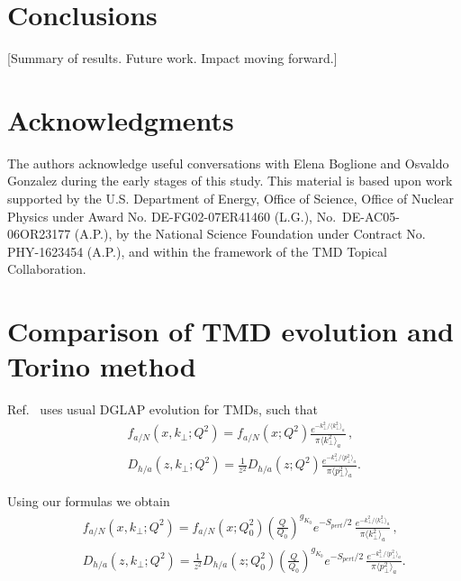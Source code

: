 \documentclass[final,3p,times,onecolumn,sort&compress,hidelinks]{elsarticle}
\begin{document}
\section{Conclusions}
\label{s:concl}

[Summary of results.  Future work.  Impact moving forward.]



\section*{Acknowledgments}

The authors acknowledge useful conversations with Elena Boglione and 
Osvaldo Gonzalez during the early stages of this study.
This material is based upon work supported by the U.S. Department of 
Energy, Office of Science, Office of Nuclear Physics under Award No. 
DE-FG02-07ER41460 (L.G.), No.~DE-AC05-06OR23177 (A.P.), by the National 
Science Foundation under Contract No. PHY-1623454 (A.P.), and within the 
framework of the TMD Topical Collaboration.


\appendix
\section{Comparison of TMD evolution and Torino method}
\label{appendix}

Ref.~\cite{Anselmino:2013lza} uses usual DGLAP evolution for TMDs, such that
\begin{eqnarray}
&&f_{a/N} (x,k_\perp; Q^2)= f_{a/N} (x; Q^2) \frac{e^{-k_\perp^2/{\langle k_\perp^2 \rangle_a}}}{\pi \langle k_\perp^2 \rangle_a}\,,
\nonumber \\[0.3cm]
&&D_{h/a}(z,k_\perp; Q^2) =  \frac{1}{z^2} D_{h/a}(z; Q^2) \frac{e^{-k_\perp^2/{\langle p_\perp^2 \rangle_a}}}{\pi \langle p_\perp^2 \rangle_a}.
\label{e:FF_ansatzTorino}
\end{eqnarray}

Using our formulas we obtain
\begin{eqnarray}
&&f_{a/N} (x,k_\perp; Q^2)= f_{a/N} (x; Q_0^2) \left( \frac{Q}{Q_0}\right)^{g_{K_0}}e^{-S_{pert}/2}\,\frac{e^{-k_\perp^2/{\langle k_\perp^2 \rangle_a}}} {\pi \langle k_\perp^2 \rangle_a}\, ,
\nonumber \\[0.3cm]
&&D_{h/a}(z,k_\perp; Q^2) =  \frac{1}{z^2} D_{h/a}(z; Q_0^2)  \left( \frac{Q}{Q_0}\right)^{g_{K_0}}e^{-S_{pert}/2}\,  \frac{e^{-k_\perp^2/{\langle p_\perp^2 \rangle_a}}}{\pi \langle p_\perp^2 \rangle_a}.
\label{e:FF_ansatzour}
\end{eqnarray}
\end{document}
